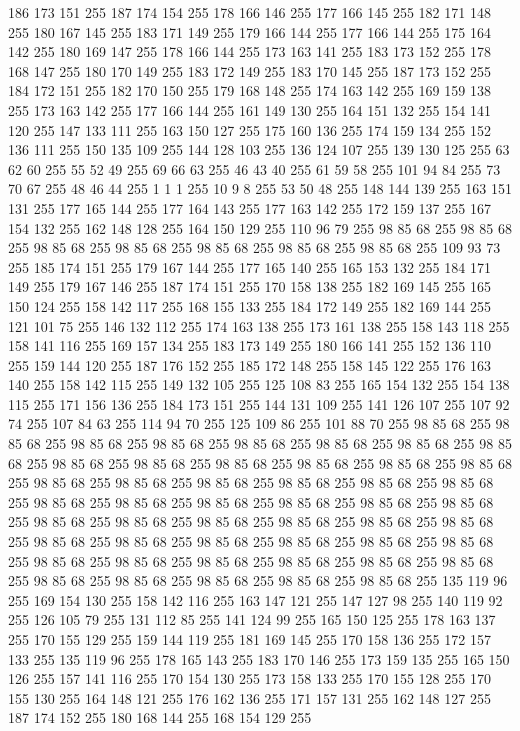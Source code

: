 186 173 151 255 187 174 154 255 178 166 146 255 177 166 145 255 182 171 148 255 180 167 145 255 183 171 149 255 179 166 144 255 177 166 144 255 175 164 142 255 180 169 147 255 178 166 144 255 173 163 141 255 183 173 152 255 178 168 147 255 180 170 149 255 183 172 149 255 183 170 145 255 187 173 152 255 184 172 151 255 182 170 150 255 179 168 148 255 174 163 142 255 169 159 138 255 173 163 142 255 177 166 144 255 161 149 130 255 164 151 132 255 154 141 120 255 147 133 111 255 163 150 127 255 175 160 136 255 174 159 134 255 152 136 111 255 150 135 109 255 144 128 103 255 136 124 107 255 139 130 125 255 63 62 60 255 55 52 49 255 69 66 63 255 46 43 40 255 61 59 58 255 101 94 84 255 73 70 67 255 48 46 44 255 1 1 1 255 10 9 8 255 53 50 48 255 148 144 139 255 163 151 131 255 177 165 144 255 177 164 143 255 177 163 142 255 172 159 137 255 167 154 132 255 162 148 128 255 164 150 129 255 110 96 79 255 98 85 68 255 98 85 68 255 98 85 68 255 98 85 68 255 98 85 68 255
98 85 68 255 98 85 68 255 109 93 73 255 185 174 151 255 179 167 144 255 177 165 140 255 165 153 132 255 184 171 149 255 179 167 146 255 187 174 151 255 170 158 138 255 182 169 145 255 165 150 124 255 158 142 117 255 168 155 133 255 184 172 149 255 182 169 144 255 121 101 75 255 146 132 112 255 174 163 138 255 173 161 138 255 158 143 118 255 158 141 116 255 169 157 134 255 183 173 149 255 180 166 141 255 152 136 110 255 159 144 120 255 187 176 152 255 185 172 148 255 158 145 122 255 176 163 140 255 158 142 115 255 149 132 105 255 125 108 83 255 165 154 132 255 154 138 115 255 171 156 136 255 184 173 151 255 144 131 109 255 141 126 107 255 107 92 74 255 107 84 63 255 114 94 70 255 125 109 86 255 101 88 70 255 98 85 68 255 98 85 68 255 98 85 68 255 98 85 68 255 98 85 68 255 98 85 68 255 98 85 68 255 98 85 68 255 98 85 68 255 98 85 68 255 98 85 68 255 98 85 68 255 98 85 68 255 98 85 68 255 98 85 68 255 98 85 68 255 98 85 68 255 98 85 68 255
98 85 68 255 98 85 68 255 98 85 68 255 98 85 68 255 98 85 68 255 98 85 68 255 98 85 68 255 98 85 68 255 98 85 68 255 98 85 68 255 98 85 68 255 98 85 68 255 98 85 68 255 98 85 68 255 98 85 68 255 98 85 68 255 98 85 68 255 98 85 68 255 98 85 68 255 98 85 68 255 98 85 68 255 98 85 68 255 98 85 68 255 98 85 68 255 98 85 68 255 98 85 68 255 98 85 68 255 98 85 68 255 98 85 68 255 98 85 68 255 98 85 68 255 135 119 96 255 169 154 130 255 158 142 116 255 163 147 121 255 147 127 98 255 140 119 92 255 126 105 79 255 131 112 85 255 141 124 99 255 165 150 125 255 178 163 137 255 170 155 129 255 159 144 119 255 181 169 145 255 170 158 136 255 172 157 133 255 135 119 96 255 178 165 143 255 183 170 146 255 173 159 135 255 165 150 126 255 157 141 116 255 170 154 130 255 173 158 133 255 170 155 128 255 170 155 130 255 164 148 121 255 176 162 136 255 171 157 131 255 162 148 127 255 187 174 152 255 180 168 144 255 168 154 129 255
